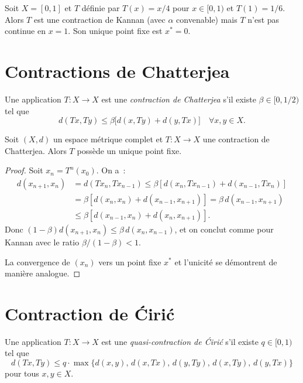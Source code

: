 \begin{exemple}
Soit $X = [0, 1]$ et $T$ d\'efinie par $T(x) = x/4$ pour $x \in [0, 1)$ et
$T(1) = 1/6$. Alors $T$ est une contraction de Kannan (avec $\alpha$ convenable)
mais $T$ n'est pas continue en $x = 1$. Son unique point fixe est $x^* = 0$.
\end{exemple}

\section{Contractions de Chatterjea}

\begin{definition}
Une application $T : X \to X$ est une \emph{contraction de Chatterjea} s'il
existe $\beta \in [0, 1/2)$ tel que
\[
    d(Tx, Ty) \leq \beta \bigl[ d(x, Ty) + d(y, Tx) \bigr] \quad \forall x, y \in X.
\]
\end{definition}

\begin{theoreme}[Chatterjea, 1972]
Soit $(X, d)$ un espace m\'etrique complet et $T : X \to X$ une contraction de
Chatterjea. Alors $T$ poss\`ede un unique point fixe.
\end{theoreme}

\begin{proof}
Soit $x_n = T^n(x_0)$. On a~:
\begin{align*}
    d(x_{n+1}, x_n) &= d(Tx_n, Tx_{n-1})
    \leq \beta[d(x_n, Tx_{n-1}) + d(x_{n-1}, Tx_n)] \\
    &= \beta[d(x_n, x_n) + d(x_{n-1}, x_{n+1})]
    = \beta \, d(x_{n-1}, x_{n+1}) \\
    &\leq \beta[d(x_{n-1}, x_n) + d(x_n, x_{n+1})].
\end{align*}
Donc $(1 - \beta) d(x_{n+1}, x_n) \leq \beta \, d(x_n, x_{n-1})$, et on
conclut comme pour Kannan avec le ratio $\beta/(1-\beta) < 1$.

La convergence de $(x_n)$ vers un point fixe $x^*$ et l'unicit\'e se
d\'emontrent de mani\`ere analogue.
\end{proof}

\section{Contraction de \'Ciri\'c}

\begin{definition}
Une application $T : X \to X$ est une \emph{quasi-contraction de \'Ciri\'c}
s'il existe $q \in [0, 1)$ tel que
\[
    d(Tx, Ty) \leq q \cdot \max\{d(x,y),\, d(x, Tx),\, d(y, Ty),\, d(x, Ty),\, d(y, Tx)\}
\]
pour tous $x, y \in X$.
\end{definition}

